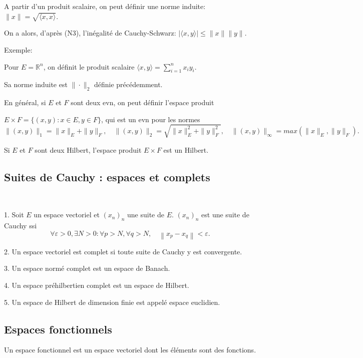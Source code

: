 A partir d'un produit scalaire, on peut définir une norme induite: $\|x\|=\sqrt{\langle x, x\rangle}$.

 On a alors, d'après (N3), l'inégalité de Cauchy-Schwarz: $|\langle x, y\rangle | \leq\|x\|\|y\|$.

Exemple: 

Pour $E=\mathbb{R}^{n}$, on définit le produit scalaire $\langle x, y\rangle =\sum_{i=1}^{n} x_{i} y_{i} .$ 

Sa norme induite est $\|\cdot \|_{2}$ définie précédemment.

En général, si $E$ et $F$ sont deux evn, on peut définir l'espace produit 

$E\times F=\{ (x,y): x\in E, y\in F\}$, qui est un evn pour les normes 
$$
\|(x,y) \|_{1}= \|x \|_E+\|y \|_F,\quad  \|(x,y) \|_{2}= \sqrt{\|x \|_E^2+\|y \|_F^2}, \quad \|(x,y) \|_{\infty}=max(\|x \|_E,\|y \|_F). 
$$ 

Si $E$ et $F$ sont deux Hilbert, l'espace produit $E\times F$ est un Hilbert. 
\subsection{Suites de Cauchy : espaces et complets}

\begin{definition} \
	
1. 	\; Soit $E$ un espace vectoriel et $\left(x_{n}\right)_{n}$ une suite de $E $. $\left(x_{n}\right)_{n}$ est une suite de Cauchy ssi 
$$
\forall \varepsilon>0, \exists N >0 : \forall p>N, \forall q>N, \quad\left\|x_{p}-x_{q}\right\|<\varepsilon.
$$
	

2. \; Un espace vectoriel est complet si toute suite de Cauchy y est convergente.

3. \;  Un espace normé complet est un espace de Banach.

4. \; Un espace préhilbertien complet est un espace de Hilbert.

5. \;  Un espace de Hilbert de dimension finie est appelé espace euclidien.

\end{definition}


\subsection{Espaces fonctionnels}
\begin{definition}
	
Un espace fonctionnel est un espace vectoriel dont les éléments sont des fonctions.

\end{definition} 


